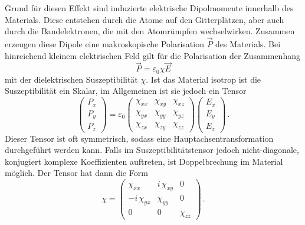 Grund für diesen Effekt sind induzierte elektrische Dipolmomente innerhalb des Materials. Diese entstehen durch die Atome
auf den Gitterplätzen, aber auch durch die Bandelektronen, die mit den Atomrümpfen wechselwirken. Zusammen erzeugen diese
Dipole eine makroskopische Polarisation $\vec{P}$ des Materials. Bei hinreichend kleinem elektrischen Feld gilt für die 
Polarisation der Zusammenhang
\begin{equation}
    \label{eq:Pol}
    \vec{P} = \varepsilon_0 \chi \vec{E}
\end{equation}
mit der dielektrischen Suszeptibilität $\chi$. Ist das Material isotrop ist die Suszeptibilität ein Skalar, im Allgemeinen
ist sie jedoch ein Tensor
\begin{equation*}
    \begin{pmatrix}
        P_x \\
        P_y \\
        P_z
    \end{pmatrix}
    = \varepsilon_0 \begin{pmatrix}
        \chi_{xx} & \chi_{xy} & \chi_{xz} \\
        \chi_{yx} & \chi_{yy} & \chi_{yz} \\
        \chi_{zx} & \chi_{zy} & \chi_{zz}
    \end{pmatrix}
    \begin{pmatrix}
        E_x \\
        E_y \\
        E_z 
    \end{pmatrix} \, .
\end{equation*}
Dieser Tensor ist oft symmetrisch, sodass eine Hauptachsentransformation durchgeführt werden kann. Falls im Suszeptibilitätstensor
jedoch nicht-diagonale, konjugiert komplexe Koeffizienten auftreten, ist Doppelbrechung im Material möglich.
Der Tensor hat dann die Form 
\begin{equation}
    \label{eq:tensor}
    \chi
    = \begin{pmatrix}
        \chi_{xx} & i \, \chi_{xy} & 0 \\
        - i \, \chi_{yx} & \chi_{yy} & 0 \\
        0 & 0 & \chi_{zz}
    \end{pmatrix} \, .
\end{equation}
